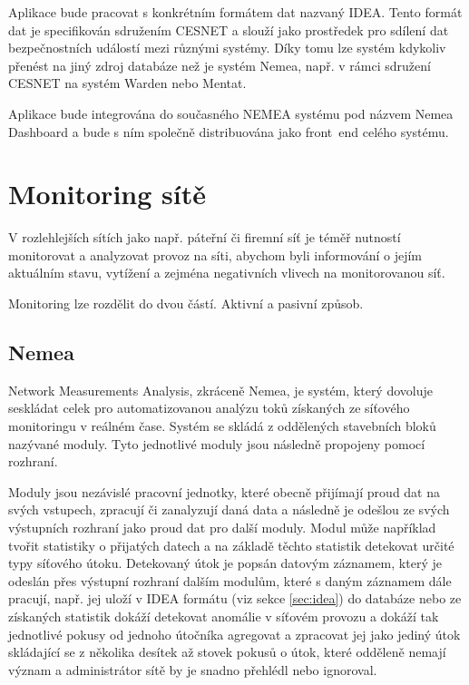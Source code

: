 Aplikace bude pracovat s konkrétním formátem dat nazvaný IDEA. Tento formát dat je specifikován sdružením CESNET a slouží jako prostředek pro sdílení dat bezpečnostních událostí mezi různými systémy. Díky tomu lze systém kdykoliv přenést na jiný zdroj databáze než je systém Nemea, např. v rámci sdružení CESNET na systém Warden nebo Mentat.

Aplikace bude integrována do současného NEMEA systému pod názvem Nemea Dashboard a bude s ním společně distribuována jako front~end celého systému.

\chapter{Monitoring sítě}

V rozlehlejších sítích jako např. páteřní či firemní síť je téměř nutností monitorovat a analyzovat provoz na síti, abychom byli informování o jejím aktuálním stavu, vytížení a zejména negativních vlivech na monitorovanou síť.

Monitoring lze rozdělit do dvou částí. Aktivní a pasivní způsob.

\section{Nemea}

Network Measurements Analysis, zkráceně Nemea, je systém, který dovoluje seskládat celek pro automatizovanou analýzu toků získaných ze síťového monitoringu v reálném čase. Systém se skládá z oddělených stavebních bloků nazývané moduly. Tyto jednotlivé moduly jsou následně propojeny pomocí rozhraní.

Moduly jsou nezávislé pracovní jednotky, které obecně přijímají proud dat na svých vstupech, zpracují či zanalyzují daná data a následně je odešlou ze svých výstupních rozhraní jako proud dat pro další moduly. Modul může například tvořit statistiky o přijatých datech a na základě těchto statistik detekovat určité typy síťového útoku. Detekovaný útok je popsán datovým záznamem, který je odeslán přes výstupní rozhraní dalším modulům, které s daným záznamem dále pracují, např. jej uloží v IDEA formátu (viz sekce \ref{sec:idea}) do databáze nebo ze získaných statistik dokáží detekovat anomálie v síťovém provozu a dokáží tak jednotlivé pokusy od jednoho útočníka agregovat a zpracovat jej jako jediný útok skládající se z několika desítek až stovek pokusů o útok, které odděleně nemají význam a administrátor sítě by je snadno přehlédl nebo ignoroval.


